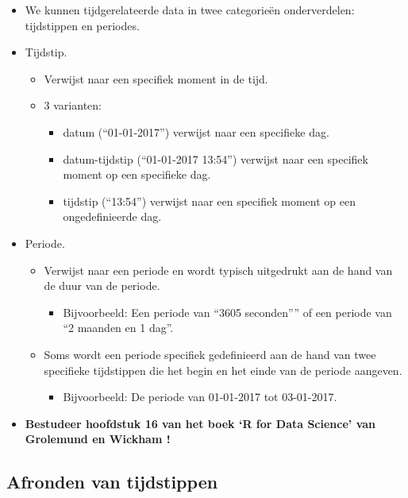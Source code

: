 \documentclass[]{tufte-book}
\providecommand{\tightlist}{%
  \setlength{\itemsep}{0pt}\setlength{\parskip}{0pt}}
\begin{document}
\begin{itemize}
\tightlist
\item
  We kunnen tijdgerelateerde data in twee categorieën onderverdelen: tijdstippen en periodes.
\item
  Tijdstip.

  \begin{itemize}
  \tightlist
  \item
    Verwijst naar een specifiek moment in de tijd.
  \item
    3 varianten:

    \begin{itemize}
    \tightlist
    \item
      datum (``01-01-2017'') verwijst naar een specifieke dag.
    \item
      datum-tijdstip (``01-01-2017 13:54'') verwijst naar een specifiek moment op een specifieke dag.
    \item
      tijdstip (``13:54'') verwijst naar een specifiek moment op een ongedefinieerde dag.
    \end{itemize}
  \end{itemize}
\item
  Periode.

  \begin{itemize}
  \tightlist
  \item
    Verwijst naar een periode en wordt typisch uitgedrukt aan de hand van de duur van de periode.

    \begin{itemize}
    \tightlist
    \item
      Bijvoorbeeld: Een periode van ``3605 seconden'''' of een periode van ``2 maanden en 1 dag''.
    \end{itemize}
  \item
    Soms wordt een periode specifiek gedefinieerd aan de hand van twee specifieke tijdstippen die het begin en het einde van de periode aangeven.

    \begin{itemize}
    \tightlist
    \item
      Bijvoorbeeld: De periode van 01-01-2017 tot 03-01-2017.
    \end{itemize}
  \end{itemize}
\item
  \textbf{Bestudeer hoofdstuk 16 van het boek `R for Data Science' van Grolemund en Wickham !}
\end{itemize}

\hypertarget{afronden-van-tijdstippen}{%
\subsection{Afronden van tijdstippen}\label{afronden-van-tijdstippen}}
\end{document}
